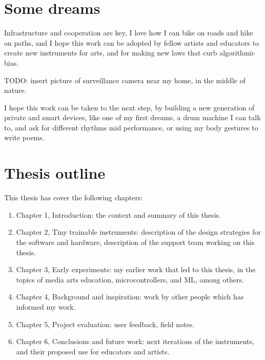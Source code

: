 \section{Some dreams}

Infrastructure and cooperation are key, I love how I can bike on roads and hike on paths, and I hope this work can be adopted by fellow artists and educators to create new instruments for arts, and for making new laws that curb algorithmic bias.

TODO: insert picture of surveillance camera near my home, in the middle of nature.

I hope this work can be taken to the next step, by building a new generation of private and smart devices, like one of my first dreams, a drum machine I can talk to, and ask for different rhythms mid performance, or using my body gestures to write poems.

\section{Thesis outline}

This thesis has cover the following chapters:

\begin{enumerate}
  \item Chapter 1, Introduction: the context and summary of this thesis.
  \item Chapter 2, Tiny trainable instruments: description of the design strategies for the software and hardware, description of the support team working on this thesis.
  \item Chapter 3, Early experiments: my earlier work that led to this thesis, in the topics of media arts education, microcontrollers, and \acrshort{ML}, among others.
  \item Chapter 4, Background and inspiration: work by other people which has informed my work.
  \item Chapter 5, Project evaluation: user feedback, field notes.
  \item Chapter 6, Conclusions and future work: next iterations of the instruments, and their proposed use for educators and artists.
  \end{enumerate}
